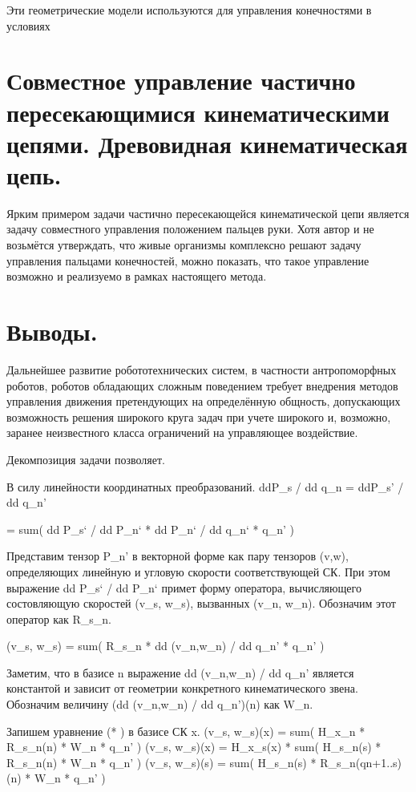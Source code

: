 \documentclass[12pt,a4paper,titlepage]{article}
\begin{document}
Эти геометрические модели используются для управления конечностями в условиях

\newpage 
\section{Совместное управление частично пересекающимися кинематическими цепями. Древовидная кинематическая цепь.}

Ярким примером задачи частично пересекающейся кинематической цепи является задачу совместного управления положением пальцев руки. Хотя автор и не возьмётся утверждать, что живые организмы комплексно решают задачу управления пальцами конечностей, можно показать, что такое управление возможно и реализуемо в рамках настоящего метода.

\newpage
\section{Выводы.}
Дальнейшее развитие робототехнических систем, в частности антропоморфных роботов, роботов обладающих сложным поведением требует внедрения методов управления движения претендующих на определённую общность, допускающих возможность решения широкого круга задач при учете широкого и, возможно, заранее неизвестного класса ограничений на управляющее воздействие.

Декомпозиция задачи позволяет.

\newpage
В силу линейности координатных преобразований. 
ddP\_s / dd q\_n = ddP\_s' / dd q\_n'

 = sum( dd P\_s` / dd P\_n` * dd P\_n` / dd q\_n` * q\_n' )

 Представим тензор P\_n' в векторной форме как пару тензоров (v,w), определяющих линейную и угловую скорости соответствующей СК. При этом выражение 
 dd P\_s` / dd P\_n` примет форму оператора, вычисляющего состовляющую скоростей (v\_s, w\_s), вызванных (v\_n, w\_n). Обозначим этот оператор как R\_s\_n.

(v\_s, w\_s) = sum(  R\_s\_n * dd (v\_n,w\_n) / dd q\_n' * q\_n' )

Заметим, что в базисе n выражение dd (v\_n,w\_n) / dd q\_n' является константой и зависит от геометрии конкретного кинематического звена. Обозначим величину (dd (v\_n,w\_n) / dd q\_n')(n) как W\_n.

Запишем уравнение (* ) в базисе СК x.
(v\_s, w\_s)(x) = sum( H\_x\_n * R\_s\_n(n) * W\_n * q\_n' )
(v\_s, w\_s)(x) = H\_x\_s(x) * sum( H\_s\_n(s) * R\_s\_n(n) * W\_n * q\_n' )
(v\_s, w\_s)(s) = sum( H\_s\_n(s) * R\_s\_n(qn+1..s)(n) * W\_n * q\_n' )
\end{document}
